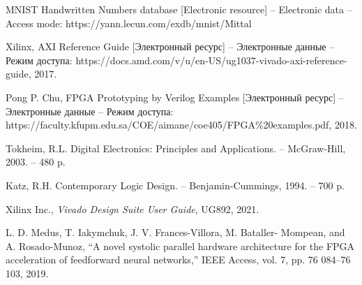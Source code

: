 \begin{thebibliography}{99}
     MNIST Handwritten Numbers database [Electronic resource] – Electronic data – Access mode: https://yann.lecun.com/exdb/mnist/Mittal

     Xilinx, {AXI Reference Guide} [Электронный ресурс] – Электронные данные – Режим доступа: https://docs.amd.com/v/u/en-US/ug1037-vivado-axi-reference-guide, 2017.

     Pong P. Chu, {FPGA Prototyping by Verilog Examples} [Электронный ресурс] – Электронные данные – Режим доступа: https://faculty.kfupm.edu.sa/COE/aimane/coe405/FPGA\%20examples.pdf, 2018.

     Tokheim, R.L. Digital Electronics: Principles and Applications. – McGraw-Hill, 2003. – 480 p.

     Katz, R.H. Contemporary Logic Design. – Benjamin-Cummings, 1994. – 700 p.

     Xilinx Inc., \textit{Vivado Design Suite User Guide}, UG892, 2021.  

      L. D. Medus, T. Iakymchuk, J. V. Frances-Villora, M. Bataller-
Mompean, and A. Rosado-Munoz, “A novel systolic parallel hardware
architecture for the FPGA acceleration of feedforward neural networks,”
IEEE Access, vol. 7, pp. 76 084–76 103, 2019.


\end{thebibliography}
